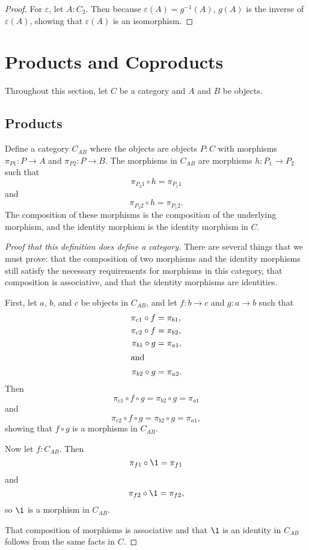 \documentclass[../math.tex]{subfiles}
\begin{document}
\begin{proof}
    For $\varepsilon$, let $A : C_2$.  Then because $\varepsilon(A) =
    g^{-1}(A)$, $g(A)$ is the inverse of $\varepsilon(A)$, showing that
    $\varepsilon(A)$ is an isomorphism.
\end{proof}

\section{Products and Coproducts}

Throughout this section, let $C$ be a category and $A$ and $B$ be objects.

\subsection{Products}

\begin{definition}
    Define a category $C_{AB}$ where the objects are objects $P : C$ with
    morphisms $\pi_{P1} : P \to A$ and $\pi_{P2} : P \to B$.  The morphisms in
    $C_{AB}$ are morphisms $h : P_1 \to P_2$ such that
    \[
        \pi_{P_2 1} \circ h = \pi_{P_1 1}
    \]
    and
    \[
        \pi_{P_2 2} \circ h = \pi_{P_1 2}.
    \]
    The composition of these morphisms is the composition of the underlying
    morphism, and the identity morphism is the identity morphism in $C$.
\end{definition}
\begin{proof}[Proof that this definition does define a category]
    There are several things that we must prove: that the composition of two
    morphisms and the identity morphisms still satisfy the necessary
    requirements for morphisms in this category, that composition is
    associative, and that the identity morphisms are identities.

    First, let $a$, $b$, and $c$ be objects in $C_{AB}$, and let $f : b \to c$
    and $g : a \to b$ such that
    \begin{align*}
        \pi_{c1} \circ f &= \pi_{b1}, \\
        \pi_{c2} \circ f &= \pi_{b2}, \\
        \pi_{b1} \circ g &= \pi_{a1}, \\
    \intertext{and}
        \pi_{b2} \circ g &= \pi_{a2}.
    \end{align*}
    Then
    \[
        \pi_{c1} \circ f \circ g = \pi_{b2} \circ g = \pi_{a1}
    \]
    and
    \[
        \pi_{c2} \circ f \circ g = \pi_{b2} \circ g = \pi_{a1},
    \]
    showing that $f \circ g$ is a morphisms in $C_{AB}$.

    Now let $f : C_{AB}$.  Then
    \[
        \pi_{f1} \circ \1 = \pi_{f1}
    \]
    and
    \[
        \pi_{f2} \circ \1 = \pi_{f2},
    \]
    so $\1$ is a morphism in $C_{AB}$.

    That composition of morphisms is associative and that $\1$ is an identity in
    $C_{AB}$ follows from the same facts in $C$.
\end{proof}
\end{document}
